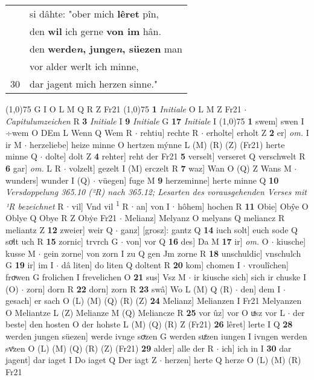 \documentclass[8pt,a4paper,notitlepage]{article}
\begin{document}
\begin{table}[ht]
\begin{minipage}[t]{0.5\linewidth}
\begin{tabular}{rl}
 & si dâhte: "ober mich \textbf{lêret} pîn,\\ 
 & den \textbf{wil} ich gerne \textbf{von im} hân.\\ 
 & den \textbf{werde\textit{n}, junge\textit{n}, süezen} man\\ 
 & vor alder werlt ich minne,\\ 
30 & dar jagent mich herzen sinne."\\ 
\end{tabular}
\scriptsize
\line(1,0){75} \newline
G I O L M Q R Z Fr21 \newline
\line(1,0){75} \newline
\textbf{1} \textit{Initiale} O L M Z Fr21   $\cdot$ \textit{Capitulumzeichen} R  \textbf{3} \textit{Initiale} I  \textbf{9} \textit{Initiale} G  \textbf{17} \textit{Initiale} I  \newline
\line(1,0){75} \newline
\textbf{1} swem] swen I ÷wem O DEm L Wenn Q Wem R  $\cdot$ rehtiu] rechte R  $\cdot$ erholte] erholt Z \textbf{2} er] \textit{om.} I ir M  $\cdot$ herzeliebe] heize minne O hertzen mýnne L (M) (R) (Z) (Fr21) herte minne Q  $\cdot$ dolte] dolt Z \textbf{4} rehter] reht der Fr21 \textbf{5} verselt] verseret Q verschwelt R \textbf{6} gar] \textit{om.} L R  $\cdot$ volzelt] gezelt I (M) erczelt R \textbf{7} waz] Wan O (Q) Z Wans M  $\cdot$ wunders] wunder I (Q)  $\cdot$ vüegen] fuge M \textbf{9} herzeminne] herte minne Q \textbf{10} \textit{Versdoppelung 365.10 (²R) nach 365.12; Lesarten des vorausgehenden Verses mit ¹R bezeichnet} R   $\cdot$ vil] Vnd vil \textsuperscript{1}\hspace{-1.3mm} R  $\cdot$ an] von I  $\cdot$ hôhem] hochen R \textbf{11} Obie] Obŷe O Oblye Q Obye R Z Obẏe Fr21  $\cdot$ Melianz] Melyanz O melyans Q meliancz R meliantz Z \textbf{12} zweier] weir Q  $\cdot$ ganz] [grosz]: gantz Q \textbf{14} iuch solt] euch sode Q soͯlt uch R \textbf{15} zornic] trvrch G  $\cdot$ von] vor Q \textbf{16} des] Da M \textbf{17} ir] \textit{om.} O  $\cdot$ kiusche] kusse M  $\cdot$ gein zorne] von zorn I zu Q gen Jm zorne R \textbf{18} unschuldic] vnschulch G \textbf{19} ir] im I  $\cdot$ dâ liten] do liten Q doltent R \textbf{20} kom] chomen I  $\cdot$ vroulîchen] froͮwen G frolichen I frevelichen O \textbf{21} sus] Vsz M  $\cdot$ ir kiusche sich] sich ir chuske I (O)  $\cdot$ zorn] dorn R \textbf{22} dorn] zorn R \textbf{23} swâ] Wo L (M) Q (R)  $\cdot$ den] dem I  $\cdot$ gesach] er sach O (L) (M) (Q) (R) (Z) \textbf{24} Melianz] Melianzen I Fr21 Melyanzen O Meliantze L (Z) Melianze M (Q) Meliancze R \textbf{25} vor ûz] vor O uͯsz vor L  $\cdot$ der beste] den hosten O der hohste L (M) (Q) (R) Z (Fr21) \textbf{26} lêret] lerte I Q \textbf{28} werden jungen süezen] werde ivnge soͮzen G werden suͤzen iungen I ivngen werden svͦzen O (L) (M) (Q) (R) (Z) (Fr21) \textbf{29} alder] alle der R  $\cdot$ ich] ich in I \textbf{30} dar jagent] dar iaget I Do iaget Q Der iagt Z  $\cdot$ herzen] herte Q herze O (L) (M) (R) Fr21 \newline

\end{minipage}
\end{table}
\end{document}
